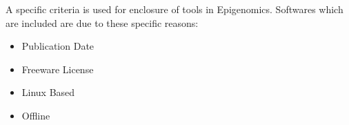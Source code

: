 \documentclass[10pt,letterpaper]{article}
\begin{document}
A specific criteria is used for enclosure of tools in Epigenomics. Softwares which are included are due to these specific reasons:
\begin{itemize}
\item Publication Date
\item Freeware License
\item Linux Based
\item Offline
\end{itemize}
\bigskip

\linenumbers







\end{document}
